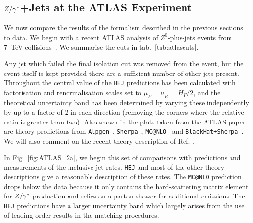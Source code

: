 	\subsection{$Z/\gamma^*$+Jets at the ATLAS Experiment}
		\label{sub:ATLASZsec}

		We now compare the results of the formalism described in the previous sections
		to data.  We begin with a recent ATLAS analysis of $Z^0$-plus-jets events from
		7~TeV collisions~\cite{Aad:2013ysa}.  We summarise the cuts in tab.~\eqref{tab:atlascuts}.

		Any jet which failed the final isolation cut was removed from the event, but the
		event itself is kept provided there are a sufficient number of other jets
		present.  Throughout the central value of the \texttt{HEJ} predictions has been
		calculated with factorisation and renormalisation scales set to
		$\mu_F=\mu_R=H_T/2$, and the theoretical uncertainty band has been determined by
		varying these independently by up to a factor of 2 in each direction (removing
		the corners where the relative ratio is greater than two).  Also shown in the
		plots taken from the ATLAS paper are theory predictions from
		\texttt{Alpgen}~\cite{Mangano:2002ea}, \texttt{Sherpa}~\cite{Gleisberg:2008ta,Hoeche:2012yf},
		\texttt{MC@NLO}~\cite{Frixione:2002ik} and
		\texttt{BlackHat+Sherpa}~\cite{Berger:2010vm,Ita:2011wn}.  We will also comment on the
		recent theory description of Ref.\cite{Frederix:2015eii} .

		In Fig.~\eqref{fig:ATLAS_2a}, we begin this set of comparisons with predictions
		and measurements of the inclusive jet rates.  \texttt{HEJ} and most of the other theory
		descriptions give a reasonable description of these rates.  The \texttt{MC@NLO}
		prediction drops below the data because it only contains the hard-scattering
		matrix element for $Z/\gamma^*$ production and relies on a parton shower for additional
		emissions. The \texttt{HEJ} predictions have a larger uncertainty band which largely
		arises from the use of leading-order results in the matching procedures.

